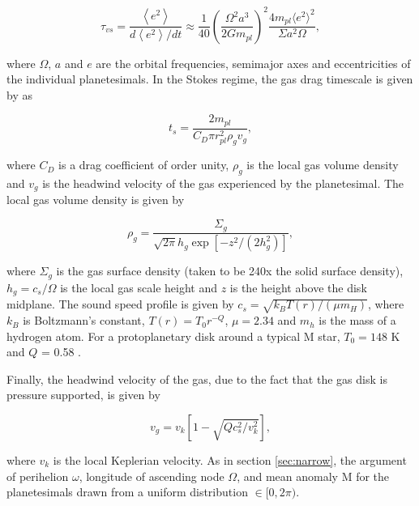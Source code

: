 \documentclass[twocolumn]{aastex63}
\begin{document}
\begin{equation}\label{eq:vs_timescale}
    \tau_{vs}  = \frac{\left< e^2 \right>}{d \left< e^2 \right> / dt} \approx \frac{1}{40}\left(\frac{\Omega^{2} a^{3}}{2 G m_{pl}}\right)^{2} \frac{4 m_{pl} \langle e^{2} \rangle^{2}}{\Sigma a^{2} \Omega},
\end{equation}

\noindent where $\Omega$, $a$ and $e$ are the orbital frequencies, semimajor axes and eccentricities of the individual planetesimals. In the Stokes regime, the gas drag timescale is given by \citet{adachi76} as

\begin{equation}\label{eq:ts_stokes}
    t_{s} = \frac{2 m_{pl}}{C_{D} \pi r_{pl}^{2} \rho_{g} v_{g}},
\end{equation}

\noindent where $C_{D}$ is a drag coefficient of order unity, $\rho_{g}$ is the local gas volume density and $v_{g}$ is the headwind velocity of the gas experienced by the planetesimal. The local gas volume density is given by

\begin{equation}\label{eq:rho_gas}
	\rho_{g} = \frac{\Sigma_{g}}{\sqrt{2 \pi} h_{g} \exp\left[ -z^{2} / \left( 2 h_{g}^{2} \right) \right]},
\end{equation}

\noindent where $\Sigma_{g}$ is the gas surface density (taken to be 240x the solid surface density), $h_{g} = c_{s} / \Omega$ is the local gas scale height and $z$ is the height above the disk midplane. The sound speed profile is given by $c_{s} = \sqrt{k_{B} T(r) / \left( \mu m_{H} \right)}$, where $k_{B}$ is Boltzmann's constant, $T(r) = T_{0} r^{-Q}$, $\mu = 2.34$ and $m_{h}$ is the mass of a hydrogen atom. For a protoplanetary disk around a typical M star, $T_{0} = 148$ K and $Q$ = 0.58 \citep{andrews05}.

Finally, the headwind velocity of the gas, due to the fact that the gas disk is pressure supported, is given by

\begin{equation}\label{eq:v_gas}
	v_{g} = v_{k} \left[ 1 - \sqrt{ Q c_{s}^2 / v_{k}^2} \right],
\end{equation}

\noindent where $v_{k}$ is the local Keplerian velocity. As in section \ref{sec:narrow}, the argument of perihelion $\omega$, longitude of ascending node $\Omega$, and mean anomaly M for the planetesimals drawn from a uniform distribution $\in [0, 2 \pi)$.
\end{document}
